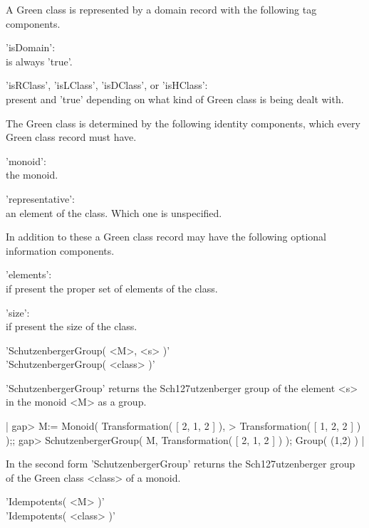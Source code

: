 
A Green class is represented  by a domain  record with the following  tag
components.

'isDomain': \\
        is always 'true'.

'isRClass', 'isLClass', 'isDClass', or 'isHClass': \\
        present and 'true' depending on what kind of Green class is being
        dealt with.

The Green class is determined by the following identity components, which
every Green class record must have.

'monoid': \\
        the monoid.

'representative': \\
        an element of the class.  Which one is unspecified.

In addition to these a Green class record may have the following optional
information components.

'elements': \\
        if present the proper set of elements of the class.

'size': \\
        if present the size of the class.


'SchutzenbergerGroup( <M>, <s> )'\\
'SchutzenbergerGroup( <class> )'

'SchutzenbergerGroup'  returns  the Sch\accent127utzenberger group of the
element <s> in the monoid <M> as a group.

|    gap> M:= Monoid( Transformation( [ 2, 1, 2 ] ),
    > Transformation( [ 1, 2, 2 ] ) );;
    gap> SchutzenbergerGroup( M, Transformation( [ 2, 1, 2 ] ) );
    Group( (1,2) ) |

In   the     second      form      'SchutzenbergerGroup'   returns    the
Sch\accent127utzenberger group of the Green class <class> of a monoid.


'Idempotents( <M> )'\\
'Idempotents( <class> )'

